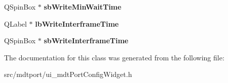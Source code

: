 \begin{DoxyCompactItemize}
\item 
\hypertarget{class_ui__mdt_port_config_widget_a4740ead5e15cd5a13200123494aabdd4}{
QSpinBox $\ast$ {\bfseries sbWriteMinWaitTime}}
\label{class_ui__mdt_port_config_widget_a4740ead5e15cd5a13200123494aabdd4}

\item 
\hypertarget{class_ui__mdt_port_config_widget_ab8640cb5cf95125b496bfbbaff548564}{
QLabel $\ast$ {\bfseries lbWriteInterframeTime}}
\label{class_ui__mdt_port_config_widget_ab8640cb5cf95125b496bfbbaff548564}

\item 
\hypertarget{class_ui__mdt_port_config_widget_afe980ec9ae205856bc2bb476feb91d32}{
QSpinBox $\ast$ {\bfseries sbWriteInterframeTime}}
\label{class_ui__mdt_port_config_widget_afe980ec9ae205856bc2bb476feb91d32}

\end{DoxyCompactItemize}


The documentation for this class was generated from the following file:\begin{DoxyCompactItemize}
\item 
src/mdtport/ui\_\-mdtPortConfigWidget.h\end{DoxyCompactItemize}
